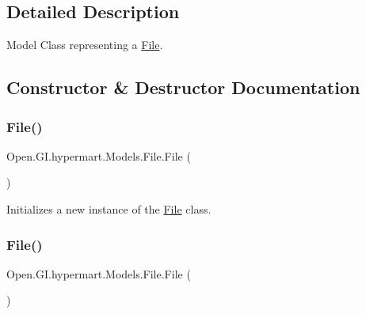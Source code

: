 \subsection{Detailed Description}
Model Class representing a \hyperlink{class_open_1_1_g_i_1_1hypermart_1_1_models_1_1_file}{File}. 



\subsection{Constructor \& Destructor Documentation}
\hypertarget{class_open_1_1_g_i_1_1hypermart_1_1_models_1_1_file_a6834fcf6e0ea0428dc2decfaa974f8d2}{}\label{class_open_1_1_g_i_1_1hypermart_1_1_models_1_1_file_a6834fcf6e0ea0428dc2decfaa974f8d2} 
\subsubsection{\texorpdfstring{File()}{File()}\hspace{0.1cm}{\footnotesize\ttfamily [1/2]}}
{\footnotesize\ttfamily Open.\+G\+I.\+hypermart.\+Models.\+File.\+File (\begin{DoxyParamCaption}{ }\end{DoxyParamCaption})}



Initializes a new instance of the \hyperlink{class_open_1_1_g_i_1_1hypermart_1_1_models_1_1_file}{File} class. 

\hypertarget{class_open_1_1_g_i_1_1hypermart_1_1_models_1_1_file_a6834fcf6e0ea0428dc2decfaa974f8d2}{}\label{class_open_1_1_g_i_1_1hypermart_1_1_models_1_1_file_a6834fcf6e0ea0428dc2decfaa974f8d2} 
\subsubsection{\texorpdfstring{File()}{File()}\hspace{0.1cm}{\footnotesize\ttfamily [2/2]}}
{\footnotesize\ttfamily Open.\+G\+I.\+hypermart.\+Models.\+File.\+File (\begin{DoxyParamCaption}{ }\end{DoxyParamCaption})}



